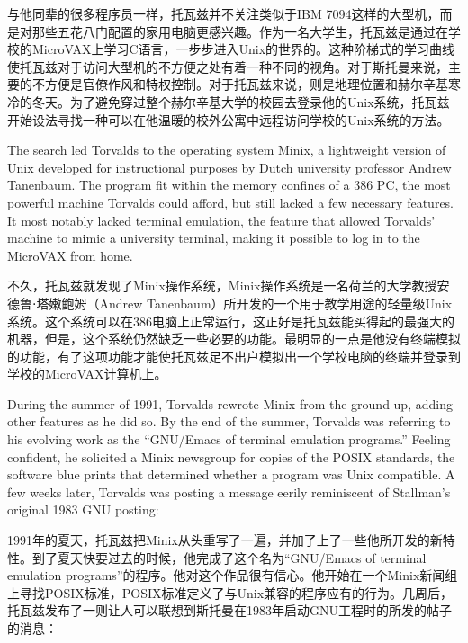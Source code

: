 \ifdefined\chs
与他同辈的很多程序员一样，托瓦兹并不关注类似于IBM 7094这样的大型机，而是对那些五花八门配置的家用电脑更感兴趣。作为一名大学生，托瓦兹是通过在学校的MicroVAX上学习C语言，一步步进入Unix的世界的。这种阶梯式的学习曲线使托瓦兹对于访问大型机的不方便之处有着一种不同的视角。对于斯托曼来说，主要的不方便是官僚作风和特权控制。对于托瓦兹来说，则是地理位置和赫尔辛基寒冷的冬天。为了避免穿过整个赫尔辛基大学的校园去登录他的Unix系统，托瓦兹开始设法寻找一种可以在他温暖的校外公寓中远程访问学校的Unix系统的方法。
\fi

\ifdefined\eng
The search led Torvalds to the operating system Minix, a lightweight version of Unix developed for instructional purposes by Dutch university professor Andrew Tanenbaum. The program fit within the memory confines of a 386 PC, the most powerful machine Torvalds could afford, but still lacked a few necessary features. It most notably lacked terminal emulation, the feature that allowed Torvalds' machine to mimic a university terminal, making it possible to log in to the MicroVAX from home.
\fi

\ifdefined\chs
不久，托瓦兹就发现了Minix操作系统，Minix操作系统是一名荷兰的大学教授安德鲁⋅塔嫩鲍姆（Andrew Tanenbaum）所开发的一个用于教学用途的轻量级Unix系统。这个系统可以在386电脑上正常运行，这正好是托瓦兹能买得起的最强大的机器，但是，这个系统仍然缺乏一些必要的功能。最明显的一点是他没有终端模拟的功能，有了这项功能才能使托瓦兹足不出户模拟出一个学校电脑的终端并登录到学校的MicroVAX计算机上。
\fi

\ifdefined\eng
During the summer of 1991, Torvalds rewrote Minix from the ground up, adding other features as he did so. By the end of the summer, Torvalds was referring to his evolving work as the ``GNU/Emacs of terminal emulation programs.'' Feeling confident, he solicited a Minix newsgroup for copies of the POSIX standards, the software blue prints that determined whether a program was Unix compatible. A few weeks later, Torvalds was posting a message eerily reminiscent of Stallman's original 1983 GNU posting:
\fi

\ifdefined\chs
1991年的夏天，托瓦兹把Minix从头重写了一遍，并加了上了一些他所开发的新特性。到了夏天快要过去的时候，他完成了这个名为``GNU/Emacs of terminal emulation programs''的程序。他对这个作品很有信心。他开始在一个Minix新闻组上寻找POSIX标准，POSIX标准定义了与Unix兼容的程序应有的行为。几周后，托瓦兹发布了一则让人可以联想到斯托曼在1983年启动GNU工程时的所发的帖子的消息：
\fi

